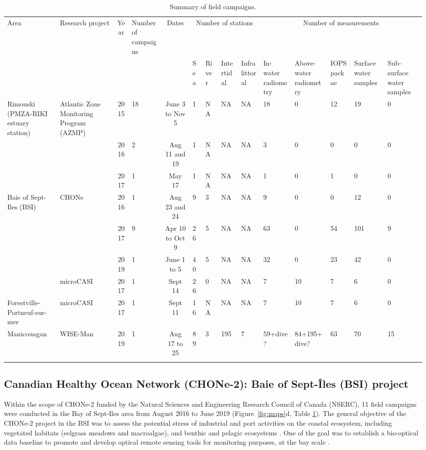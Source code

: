 \documentclass[essd, manuscript]{copernicus}
\begin{document}
\begin{table}[t]
\caption{Summary of field campaigns.}
\centering
\begin{tabular}{ p{3cm}|p{3cm}|c|p{1.5cm}|c|p{1.5cm}p{1.5cm}p{1.5cm}p{1.5cm}|p{1.5cm}p{1.5cm}p{1.5cm}p{1.5cm}p{1.5cm}  }
\tophline
Area & Research project & Year & Number of campaigns & Dates &
\multicolumn{4}{c|}{Number of stations} &
\multicolumn{5}{c}{Number of measurements}\\
\middlehline
 & & & & & Sea & River & Intertidal & Infralittoral & In-water radiometry & Above-water radiometry & IOPS packae & Surface water samples & Sub-surface water samples \\
\middlehline
Rimouski (PMZA-RIKI estuary station) & Atlantic Zone Monitoring Program (AZMP) & 2015 & 18 & June 3 to Nov 5 & 1 & NA & NA & NA & 18 & 0 & 12 & 19 & 0\\
& & 2016 & 2 & Aug 11 and 19 & 1 & NA & NA & NA & 3 & 0 & 0 & 0 & 0\\
& & 2017 & 1 & May 17 & 1 & NA & NA & NA & 1 & 0 & 1 & 0 & 0\\
\middlehline
Baie of Sept-Iles (BSI) & CHONe & 2016 & 1 & Aug 23 and 24 & 9 & 3 & NA & NA & 9 & 0 & 0 & 12 & 0\\
 & & 2017 & 9 & Apr 10 to Oct 9 & 26 & 5 & NA & NA & 63 & 0 & 54 & 101 & 9\\
 & & 2019 & 1 & June 1 to 5 & 40 & 5 & NA & NA & 32 & 0 & 23 & 42 & 0\\
 & microCASI & 2017 & 1 & Sept 14 & 26 & 0 & NA & NA & 7 & 10 & 7 & 6 & 0\\
\middlehline
Forestville-Portneuf-sur-mer & microCASI & 2017 & 1 & Sept 11 & 16 & NA & NA & NA & 7 & 10 & 7 & 6 & 0\\
\middlehline
Manicouagan & WISE-Man & 2019 & 1 & Aug 17 to 25 & 89 & 3 & 195 & 7 & 59+dive? & 84+195+dive? & 63 & 70 & 15\\
\bottomhline
 \end{tabular}
 \label{table:datasummary}
\end{table}


\subsection{Canadian Healthy Ocean Network (CHONe-2): Baie of Sept-Îles (BSI) project}
Within the scope of CHONe-2 funded by the Natural Sciences and Engineering Research Council of Canada (NSERC), 11 field campaigns were conducted in the Bay of Sept-Iles area from August 2016 to June 2019 (Figure~\ref{fig:maps}d, Table \ref{table:datasummary}).  The general objective of the CHONe-2 project in the BSI was to assess the potential stress of industrial and port activities on the coastal ecosystem, including vegetated habitats (eelgrass meadows and macroalgae), and benthic and pelagic ecosystems \citep{Ferrario2021}. One of the goal was to establish a bio-optical data baseline to promote and develop optical remote sensing tools for monitoring purposes, at the bay scale \citep{Araujo2022}.
\end{document}
